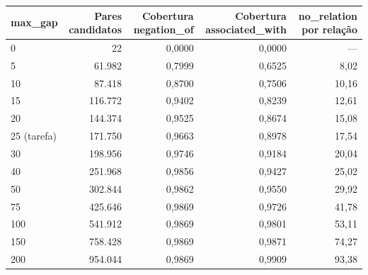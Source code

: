 \begin{tabular}{lrrrr}
\toprule
max\_gap & Pares candidatos & Cobertura negation\_of & Cobertura associated\_with & no\_relation por relação \\
\midrule
0 & 22 & 0,0000 & 0,0000 & — \\
5 & 61.982 & 0,7999 & 0,6525 & 8,02 \\
10 & 87.418 & 0,8700 & 0,7506 & 10,16 \\
15 & 116.772 & 0,9402 & 0,8239 & 12,61 \\
20 & 144.374 & 0,9525 & 0,8674 & 15,08 \\
25 (tarefa) & 171.750 & 0,9663 & 0,8978 & 17,54 \\
30 & 198.956 & 0,9746 & 0,9184 & 20,04 \\
40 & 251.968 & 0,9856 & 0,9427 & 25,02 \\
50 & 302.844 & 0,9862 & 0,9550 & 29,92 \\
75 & 425.646 & 0,9869 & 0,9726 & 41,78 \\
100 & 541.912 & 0,9869 & 0,9801 & 53,11 \\
150 & 758.428 & 0,9869 & 0,9871 & 74,27 \\
200 & 954.044 & 0,9869 & 0,9909 & 93,38 \\
\bottomrule
\end{tabular}
